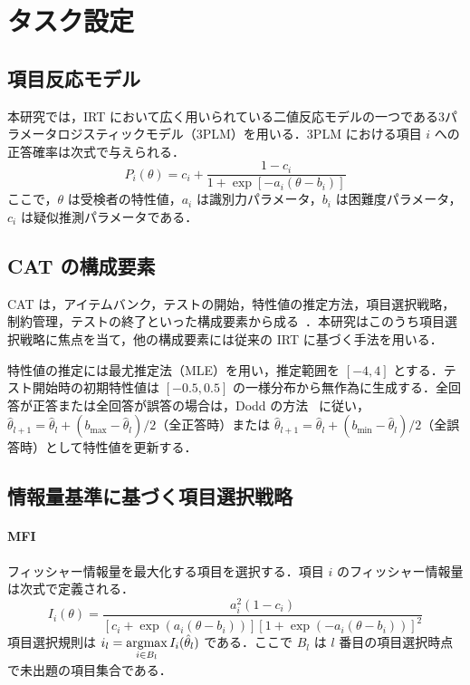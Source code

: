 \documentclass[dvipdfmx,a4j]{jarticle}
\newcommand{\argmax}{\mathop{\rm argmax}\limits}
\begin{document}
\section{タスク設定}

\subsection{項目反応モデル}

本研究では，IRT において広く用いられている二値反応モデルの一つである3パラメータロジスティックモデル（3PLM）を用いる．3PLM における項目 $i$ への正答確率は次式で与えられる．
\begin{equation}
P_i(\theta) = c_i + \frac{1 - c_i}{1 + \exp[-a_i(\theta - b_i)]}
\end{equation}
ここで，$\theta$ は受検者の特性値，$a_i$ は識別力パラメータ，$b_i$ は困難度パラメータ，$c_i$ は疑似推測パラメータである．

\subsection{CAT の構成要素}

CAT は，アイテムバンク，テストの開始，特性値の推定方法，項目選択戦略，制約管理，テストの終了といった構成要素から成る~\cite{weiss1984,frey2023}．本研究はこのうち項目選択戦略に焦点を当て，他の構成要素には従来の IRT に基づく手法を用いる．

特性値の推定には最尤推定法（MLE）を用い，推定範囲を $[-4, 4]$ とする．テスト開始時の初期特性値は $[-0.5, 0.5]$ の一様分布から無作為に生成する．全回答が正答または全回答が誤答の場合は，Dodd の方法~\cite{dodd1990} に従い，$\hat{\theta}_{l+1} = \hat{\theta}_l + (b_{\max} - \hat{\theta}_l) / 2$（全正答時）または $\hat{\theta}_{l+1} = \hat{\theta}_l + (b_{\min} - \hat{\theta}_l) / 2$（全誤答時）として特性値を更新する．

\subsection{情報量基準に基づく項目選択戦略}

\paragraph{MFI}
フィッシャー情報量を最大化する項目を選択する．項目 $i$ のフィッシャー情報量は次式で定義される．
\begin{equation}
I_i(\theta) =
\frac{a_i^2 (1 - c_i)}
{[c_i + \exp(a_i(\theta - b_i))][1 + \exp(-a_i(\theta - b_i))]^2}
\end{equation}
項目選択規則は $i_l = \argmax_{i \in B_l} I_i(\hat{\theta}_l)$ である．ここで $B_l$ は $l$ 番目の項目選択時点で未出題の項目集合である．
\end{document}
